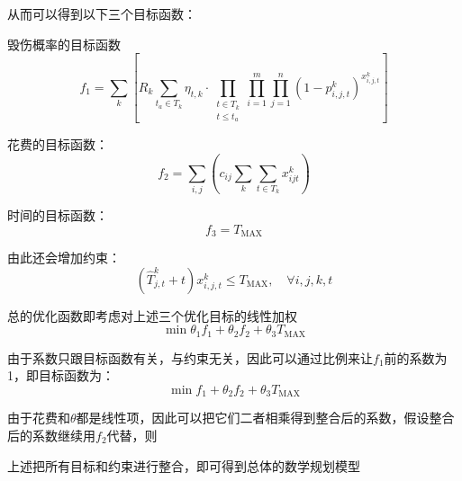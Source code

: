 从而可以得到以下三个目标函数：

毁伤概率的目标函数
\begin{equation*}
    f_1 = \sum_{k} [ R_k \sum_{t_a \in T_k}{\eta_{t,k} \cdot \prod_{\substack{t \in T_k \\ t \leq t_a}}\prod_{i = 1}^{m}\prod_{j=1}^{n}(1-p_{i,j,t}^k)^{x_{i,j,t}^k}}]
\end{equation*}

花费的目标函数：
\begin{equation*}
    f_2 = \sum_{i,j}(c_{ij} \sum_{k}\sum_{t \in T_k}{x_{ijt}^k} )
\end{equation*}

时间的目标函数：
\begin{equation*}
    f_3 = T_{\mathrm{MAX}}
\end{equation*}

由此还会增加约束：
\begin{equation*}
    (\hat{T}_{j,t}^k + t) x_{i,j,t}^k \leq T_{\mathrm{MAX}},\quad \forall i, j, k, t
\end{equation*}

总的优化函数即考虑对上述三个优化目标的线性加权
\begin{equation*}
    \min \theta_1 f_1 + \theta_2 f_2 + \theta_3 T_{\mathrm{MAX}}
\end{equation*}

由于系数只跟目标函数有关，与约束无关，因此可以通过比例来让$f_1$前的系数为1，即目标函数为：
\begin{equation*}
    \min f_1 + \theta_2 f_2 + \theta_3 T_{\mathrm{MAX}}
\end{equation*}

由于花费和$\theta$都是线性项，因此可以把它们二者相乘得到整合后的系数，假设整合后的系数继续用$f_2$代替，则

上述把所有目标和约束进行整合，即可得到总体的数学规划模型



